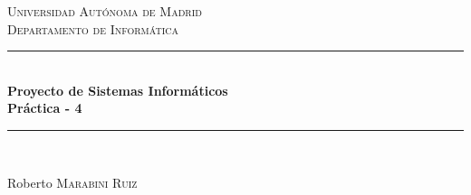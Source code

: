 \documentclass[12pt]{article} %
\begin{document}

\begin{titlepage}

\newcommand{\HRule}{\rule{\linewidth}{0.5mm}} %

\center %

\textsc{\LARGE Universidad Aut\'{o}noma de Madrid}\\[1.5cm] %
\textsc{\Large Departamento de Inform\'{a}tica}\\[0.5cm] %

\HRule \\[0.4cm]
{ \huge \bfseries Proyecto de Sistemas Inform\'{a}ticos\\[0.5cm] Pr\'{a}ctica - 4}\\[0.4cm] %
\HRule \\[1.5cm]





\vfill %
\begin{flushright}
 \large
Roberto  \textsc{Marabini Ruiz} %
\end{flushright}

\end{titlepage}
\end{document}
